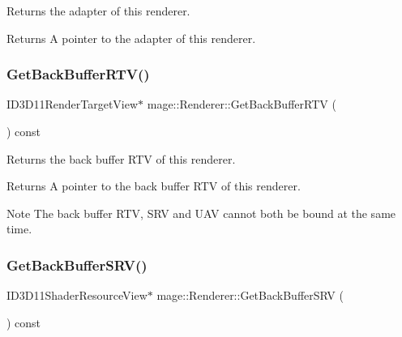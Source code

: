 Returns the adapter of this renderer.

\begin{DoxyReturn}{Returns}
A pointer to the adapter of this renderer. 
\end{DoxyReturn}
\hypertarget{classmage_1_1_renderer_a19fed9809f31ff427440bbf6a167805e}{}\label{classmage_1_1_renderer_a19fed9809f31ff427440bbf6a167805e} 
\subsubsection{\texorpdfstring{Get\+Back\+Buffer\+R\+T\+V()}{GetBackBufferRTV()}}
{\footnotesize\ttfamily I\+D3\+D11\+Render\+Target\+View$\ast$ mage\+::\+Renderer\+::\+Get\+Back\+Buffer\+R\+TV (\begin{DoxyParamCaption}{ }\end{DoxyParamCaption}) const\hspace{0.3cm}{\ttfamily [noexcept]}}

Returns the back buffer R\+TV of this renderer.

\begin{DoxyReturn}{Returns}
A pointer to the back buffer R\+TV of this renderer. 
\end{DoxyReturn}
\begin{DoxyNote}{Note}
The back buffer R\+TV, S\+RV and U\+AV cannot both be bound at the same time. 
\end{DoxyNote}
\hypertarget{classmage_1_1_renderer_af0f19d31c5f01b79c2268128fde95206}{}\label{classmage_1_1_renderer_af0f19d31c5f01b79c2268128fde95206} 
\subsubsection{\texorpdfstring{Get\+Back\+Buffer\+S\+R\+V()}{GetBackBufferSRV()}}
{\footnotesize\ttfamily I\+D3\+D11\+Shader\+Resource\+View$\ast$ mage\+::\+Renderer\+::\+Get\+Back\+Buffer\+S\+RV (\begin{DoxyParamCaption}{ }\end{DoxyParamCaption}) const\hspace{0.3cm}{\ttfamily [noexcept]}}

